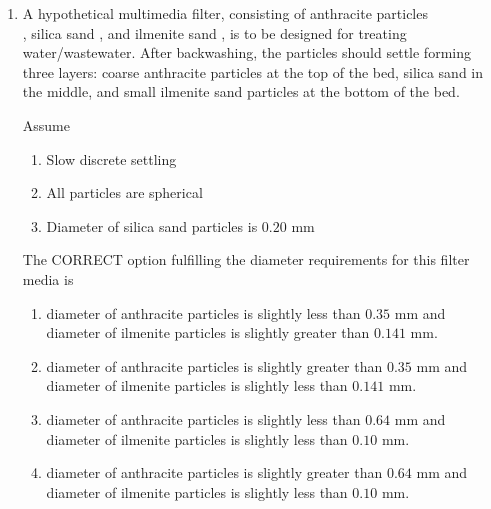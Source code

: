 \documentclass[journal,12pt,onecolumn]{article}
\theoremstyle{remark}
\begin{document}
\begin{enumerate}
    \hfill{}
    \begin{enumerate}
    \end{enumerate}

    \item A hypothetical multimedia filter, consisting of anthracite particles\\ , silica sand , and ilmenite sand ,
    is to be designed for treating water/wastewater. After backwashing, the particles
    should settle forming three layers: coarse anthracite particles at the top of the bed,
    silica sand in the middle, and small ilmenite sand particles at the bottom of the bed.
    
    Assume
    \begin{enumerate}
        \item[\brak{\text{i}}] Slow discrete settling 
        \item[\brak{\text{ii}}] All particles are spherical
        \item[\brak{\text{iii}}] Diameter of silica sand particles is $0.20$ mm
    \end{enumerate}
    The CORRECT option fulfilling the diameter requirements for this filter media is
    
    \hfill{}
    \begin{enumerate}
        \item diameter of anthracite particles is slightly less than $0.35$ mm and diameter of ilmenite
        particles is slightly greater than $0.141$ mm.
        \item diameter of anthracite particles is slightly greater than $0.35$ mm and diameter of
        ilmenite particles is slightly less than $0.141$ mm.
        \item diameter of anthracite particles is slightly less than $0.64$ mm and diameter of ilmenite
        particles is slightly less than $0.10$ mm.
        \item diameter of anthracite particles is slightly greater than $0.64$ mm and diameter of
        ilmenite particles is slightly less than $0.10$ mm.
    \end{enumerate}


\end{enumerate}
\end{document}
